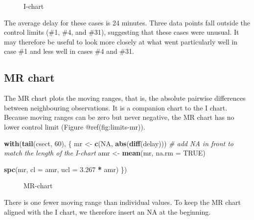 \documentclass[
]{book}
\makeatletter
\newenvironment{Shaded}{\begin{snugshade}}{\end{snugshade}}
\newcommand{\AttributeTok}[1]{\textcolor[rgb]{0.13,0.29,0.53}{#1}}
\newcommand{\CommentTok}[1]{\textcolor[rgb]{0.56,0.35,0.01}{\textit{#1}}}
\newcommand{\ConstantTok}[1]{\textcolor[rgb]{0.56,0.35,0.01}{#1}}
\newcommand{\DecValTok}[1]{\textcolor[rgb]{0.00,0.00,0.81}{#1}}
\newcommand{\FloatTok}[1]{\textcolor[rgb]{0.00,0.00,0.81}{#1}}
\newcommand{\FunctionTok}[1]{\textcolor[rgb]{0.13,0.29,0.53}{\textbf{#1}}}
\newcommand{\NormalTok}[1]{#1}
\newcommand{\OtherTok}[1]{\textcolor[rgb]{0.56,0.35,0.01}{#1}}
\newcommand{\SpecialCharTok}[1]{\textcolor[rgb]{0.81,0.36,0.00}{\textbf{#1}}}
\newcommand*\pandocbounded[1]{%
  \sbox\pandoc@box{#1}%
  \Gscale@div\@tempa{\textheight}{\dimexpr\ht\pandoc@box+\dp\pandoc@box\relax}%
  \Gscale@div\@tempb{\linewidth}{\wd\pandoc@box}%
  \ifdim\@tempb\p@<\@tempa\p@\let\@tempa\@tempb\fi%
  \ifdim\@tempa\p@<\p@\scalebox{\@tempa}{\usebox\pandoc@box}%
  \else\usebox{\pandoc@box}%
  \fi%
}
\makeatother
\begin{document}
\begin{figure}
\centering
\pandocbounded{}
\caption{I-chart}
\end{figure}

The average delay for these cases is 24 minutes. Three data points fall
outside the control limits (\#1, \#4, and \#31), suggesting that these
cases were unusual. It may therefore be useful to look more closely at
what went particularly well in case \#1 and less well in cases \#4 and
\#31.

\subsection{MR chart}\label{mr-chart}

The MR chart plots the moving ranges, that is, the absolute pairwise
differences between neighbouring observations. It is a companion chart
to the I chart. Because moving ranges can be zero but never negative,
the MR chart has no lower control limit (Figure @ref(fig:limits-mr)).

\begin{Shaded}
\begin{Highlighting}[]
\FunctionTok{with}\NormalTok{(}\FunctionTok{tail}\NormalTok{(csect, }\DecValTok{60}\NormalTok{), \{}
\NormalTok{  mr  }\OtherTok{\textless{}{-}} \FunctionTok{c}\NormalTok{(}\ConstantTok{NA}\NormalTok{, }\FunctionTok{abs}\NormalTok{(}\FunctionTok{diff}\NormalTok{(delay)))  }\CommentTok{\# add NA in front to match the length of the I{-}chart}
\NormalTok{  amr }\OtherTok{\textless{}{-}} \FunctionTok{mean}\NormalTok{(mr, }\AttributeTok{na.rm =} \ConstantTok{TRUE}\NormalTok{)}
  
  \FunctionTok{spc}\NormalTok{(mr,}
      \AttributeTok{cl  =}\NormalTok{ amr,}
      \AttributeTok{ucl =} \FloatTok{3.267} \SpecialCharTok{*}\NormalTok{ amr)}
\NormalTok{\})}
\end{Highlighting}
\end{Shaded}

\begin{figure}
\centering
\pandocbounded{}
\caption{MR-chart}
\end{figure}

There is one fewer moving range than individual values. To keep the MR
chart aligned with the I chart, we therefore insert an NA at the
beginning.
\end{document}
